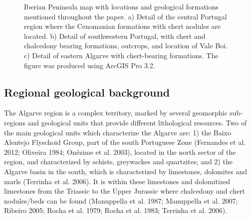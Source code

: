\documentclass[
  a4paper,
  DIV=11,
  numbers=noendperiod]{scrreprt}
\begin{document}
\begin{figure}


\caption{\label{fig-map}Iberian Peninsula map with locations and
geological formations mentioned throughout the paper. a) Detail of the
central Portugal region where the Cenomanian formations with chert
nodules are located. b) Detail of southwestern Portugal, with chert and
chalcedony bearing formations, outcrops, and location of Vale Boi. c)
Detail of eastern Algarve with chert-bearing formations. The figure was
produced using ArcGIS Pro 3.2.}

\end{figure}%

\subsection{Regional geological
background}\label{regional-geological-background}

The Algarve region is a complex territory, marked by several geomorphic
sub-regions and geological units that provide different lithological
resources. Two of the main geological units which characterize the
Algarve are: 1) the Baixo Alentejo Flyschoid Group, part of the south
Portuguese Zone (Fernandes et al. 2012; Oliveira 1984; Onézime et al.
2003), located in the north sector of the region, and characterized by
schists, greywackes and quartzites; and 2) the Algarve basin in the
south, which is characterized by limestones, dolomites and marls
(Terrinha et al. 2006). It is within these limestones and dolomitized
limestones from the Triassic to the Upper Jurassic where chalcedony and
chert nodules/beds can be found (Manuppella et al. 1987; Manuppella et
al. 2007; Ribeiro 2005; Rocha et al. 1979; Rocha et al. 1983; Terrinha
et al. 2006).
\end{document}
